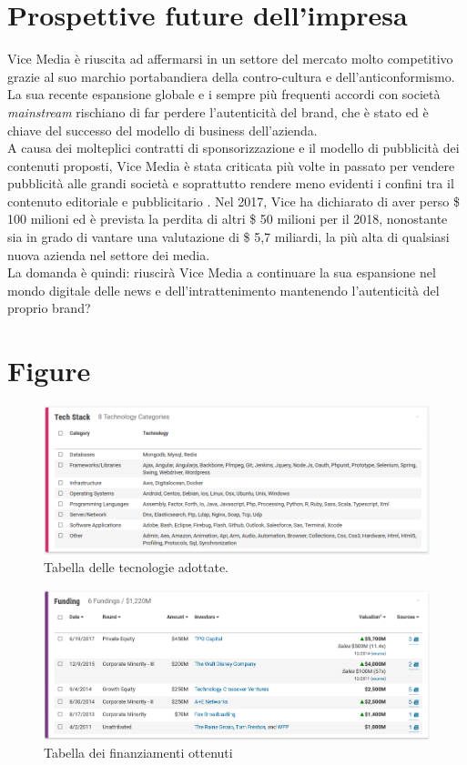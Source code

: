 \documentclass[a4paper, 11pt]{article}
\begin{document}
\section*{Prospettive future dell’impresa}
Vice Media è riuscita ad affermarsi in un settore del mercato molto competitivo grazie al suo marchio portabandiera della contro-cultura e dell'anticonformismo. La sua recente espansione globale e i sempre più frequenti accordi con società \textit{mainstream} rischiano di far perdere l'autenticità del brand, che è stato ed è chiave del successo del modello di business dell'azienda.\\
A causa dei molteplici contratti di sponsorizzazione e il modello di pubblicità dei contenuti proposti, Vice Media è stata criticata più volte in passato per vendere pubblicità alle grandi società e soprattutto rendere meno evidenti i confini tra il contenuto editoriale e pubblicitario \cite{gawker}.
Nel 2017, Vice ha dichiarato di aver perso \$ 100 milioni ed è prevista la perdita di altri \$ 50 milioni per il 2018, nonostante sia in grado di vantare una valutazione di \$ 5,7 miliardi, la più alta di qualsiasi nuova azienda nel settore dei media\cite{glenday}.\\
La domanda è quindi: riuscirà Vice Media a continuare la sua espansione nel mondo digitale delle news e dell'intrattenimento mantenendo l'autenticità del proprio brand?\\



\newpage
\section*{Figure}
\null
\vfill
\begin{figure}[h]
\includegraphics[width=\textwidth]{images/viceTech.PNG}
\caption{Tabella delle tecnologie adottate.}
\label{fig:tecnologie}
\end{figure}
\begin{figure}[h]
\includegraphics[width=\textwidth]{images/viceFundings.PNG}
\caption{Tabella dei finanziamenti ottenuti}
\label{fig:investimenti}
\end{figure}
\vfill
\end{document}
